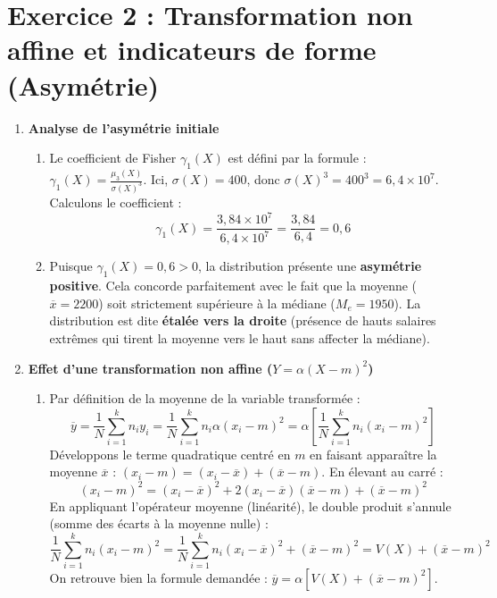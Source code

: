 \documentclass[11pt,a4paper]{article}
\begin{document}
\section*{Exercice 2 : Transformation non affine et indicateurs de forme (Asymétrie)}

\begin{enumerate}
    \item \textbf{Analyse de l'asymétrie initiale}
    \begin{enumerate}
        \item Le coefficient de Fisher $\gamma_1(X)$ est défini par la formule : $\gamma_1(X) = \frac{\mu_3(X)}{\sigma(X)^3}$.
        Ici, $\sigma(X) = 400$, donc $\sigma(X)^3 = 400^3 = 6,4 \times 10^7$. Calculons le coefficient :
        \[ \gamma_1(X) = \frac{3,84 \times 10^7}{6,4 \times 10^7} = \frac{3,84}{6,4} = 0,6 \]
        
        \item Puisque $\gamma_1(X) = 0,6 > 0$, la distribution présente une \textbf{asymétrie positive}. Cela concorde parfaitement avec le fait que la moyenne ($\overline{x} = 2200$) soit strictement supérieure à la médiane ($M_e = 1950$). La distribution est dite \textbf{étalée vers la droite} (présence de hauts salaires extrêmes qui tirent la moyenne vers le haut sans affecter la médiane).
    \end{enumerate}

    \item \textbf{Effet d'une transformation non affine ($Y = \alpha (X - m)^2$)}
    \begin{enumerate}
        \item Par définition de la moyenne de la variable transformée :
        \[ \overline{y} = \frac{1}{N}\sum_{i=1}^k n_i y_i = \frac{1}{N}\sum_{i=1}^k n_i \alpha (x_i - m)^2 = \alpha \left[ \frac{1}{N}\sum_{i=1}^k n_i (x_i - m)^2 \right] \]
        Développons le terme quadratique centré en $m$ en faisant apparaître la moyenne $\overline{x}$ :
        $(x_i - m) = (x_i - \overline{x}) + (\overline{x} - m)$. En élevant au carré :
        \[ (x_i - m)^2 = (x_i - \overline{x})^2 + 2(x_i - \overline{x})(\overline{x} - m) + (\overline{x} - m)^2 \]
        En appliquant l'opérateur moyenne (linéarité), le double produit s'annule (somme des écarts à la moyenne nulle) :
        \[ \frac{1}{N}\sum_{i=1}^k n_i (x_i - m)^2 = \frac{1}{N}\sum_{i=1}^k n_i (x_i - \overline{x})^2 + (\overline{x} - m)^2 = V(X) + (\overline{x} - m)^2 \]
        On retrouve bien la formule demandée : $\overline{y} = \alpha \left[ V(X) + (\overline{x} - m)^2 \right]$.
        

\end{enumerate}
\end{enumerate}
\end{document}
